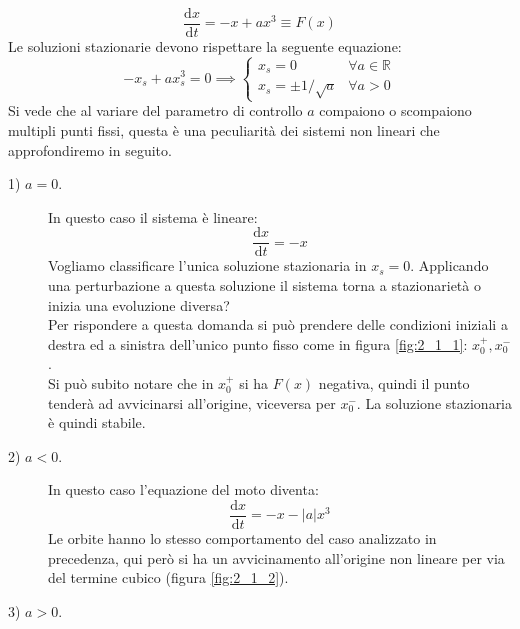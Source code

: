 \begin{exmp}
    \[
	\frac{\text{d} x}{\text{d} t} = -x + ax^3 \equiv F(x)
    \] 
    Le soluzioni stazionarie devono rispettare la seguente equazione:
    \[
        -x_s + ax_s^3 = 0 \implies  
	\begin{cases}
	    x_s = 0 & \forall a \in \mathbb{R}\\
	    x_s = \pm 1 / \sqrt{a} & \forall a > 0
        \end{cases}
    \] 
    Si vede che al variare del parametro di controllo $a$ compaiono o scompaiono multipli punti fissi, questa è una peculiarità dei sistemi non lineari che approfondiremo in seguito. 
    \begin{description}
	\item[1) $a = 0$.] In questo caso il sistema è lineare:
	    \[
	        \frac{\text{d} x}{\text{d} t} = -x
	    \] 
	    Vogliamo classificare l'unica soluzione stazionaria in $x_s = 0$. Applicando una perturbazione a questa soluzione il sistema torna a stazionarietà o inizia una evoluzione diversa? \\
	    Per rispondere a questa domanda si può prendere delle condizioni iniziali a destra ed a sinistra dell'unico punto fisso come in figura \ref{fig:2_1_1}: $x_0^+, x_0^-$. \\
	    Si può subito notare che in $x_0^+$ si ha $F(x)$ negativa, quindi il punto tenderà ad avvicinarsi all'origine, viceversa per $x_0^-$. La soluzione stazionaria è quindi stabile.
        \item[2) $a < 0$.] 
	    In questo caso l'equazione del moto diventa:
	    \[
	        \frac{\text{d} x}{\text{d} t} = -x - \left|a\right|x^3
	    \] 
	    Le orbite hanno lo stesso comportamento del caso analizzato in precedenza, qui però si ha un avvicinamento all'origine non lineare per via del termine cubico (figura \ref{fig:2_1_2}).
	\item[3) $a>0$.]
\end{description}
\end{exmp}
